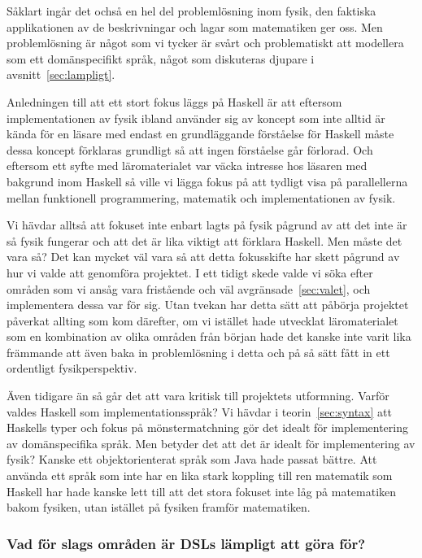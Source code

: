 \begin{draft}
Såklart ingår det ochså en hel del problemlösning inom fysik, den faktiska
applikationen av de beskrivningar och lagar som matematiken ger oss. Men
problemlösning är något som vi tycker är svårt och problematiskt att modellera
som ett domänspecifikt språk, något som diskuteras djupare i
avsnitt~\ref{sec:lampligt}.

Anledningen till att ett stort fokus läggs på Haskell är att eftersom
implementationen av fysik ibland använder sig av koncept som inte alltid är
kända för en läsare med endast en grundläggande förståelse för Haskell måste
dessa koncept förklaras grundligt så att ingen förståelse går förlorad. Och
eftersom ett syfte med läromaterialet var väcka intresse hos läsaren med
bakgrund inom Haskell så ville vi lägga fokus på att tydligt visa på
parallellerna mellan funktionell programmering, matematik och implementationen
av fysik. 

Vi hävdar alltså att fokuset inte enbart lagts på fysik pågrund av att det inte
är så fysik fungerar och att det är lika viktigt att förklara Haskell. Men måste
det vara så? Det kan mycket väl vara så att detta fokusskifte har skett pågrund
av hur vi valde att genomföra projektet. I ett tidigt skede valde vi söka efter
områden som vi ansåg vara fristående och väl avgränsade~\ref{sec:valet},
och implementera dessa var för sig. Utan tvekan har detta sätt att påbörja
projektet påverkat allting som kom därefter, om vi istället hade utvecklat
läromaterialet som en kombination av olika områden från början hade det kanske
inte varit lika främmande att även baka in problemlösning i detta och på så sätt
fått in ett ordentligt fysikperspektiv. 

Även tidigare än så går det att vara kritisk till projektets utformning. Varför
valdes Haskell som implementationsspråk? Vi hävdar i teorin~\ref{sec:syntax} att
Haskells typer och fokus på mönstermatchning gör det idealt för implementering
av domänspecifika språk.  Men betyder det att det är idealt för implementering
av fysik? Kanske ett objektorienterat språk som Java hade passat bättre. Att
använda ett språk som inte har en lika stark koppling till ren matematik som
Haskell har hade kanske lett till att det stora fokuset inte låg på matematiken
bakom fysiken, utan istället på fysiken framför matematiken.

\subsubsection{Vad för slags områden är DSLs lämpligt att göra
för?}~\label{sec:lampligt}


\end{draft}
